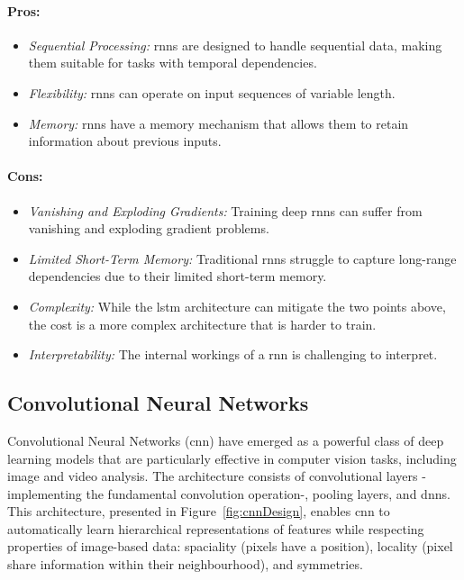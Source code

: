 \paragraph{Pros:}
\begin{itemize}
    \item \textit{Sequential Processing:} \glspl{rnn} are designed to handle sequential data, making them suitable for tasks with temporal dependencies.
    \item \textit{Flexibility:} \glspl{rnn} can operate on input sequences of variable length.
    \item \textit{Memory:} \glspl{rnn} have a memory mechanism that allows them to retain information about previous inputs.
\end{itemize}

\paragraph{Cons:}
\begin{itemize}
    \item \textit{Vanishing and Exploding Gradients:} Training deep \glspl{rnn} can suffer from vanishing and exploding gradient problems.
    \item \textit{Limited Short-Term Memory:} Traditional \glspl{rnn} struggle to capture long-range dependencies due to their limited short-term memory. 
    \item \textit{Complexity:} While the \gls{lstm} architecture can mitigate the two points above, the cost is a more complex architecture that is harder to train. 
    \item \textit{Interpretability:} The internal workings of a \gls{rnn} is challenging to interpret.
\end{itemize}

\subsection{Convolutional Neural Networks}
Convolutional Neural Networks (\gls{cnn}) \cite{NIPS198953c3bce6, NIPS2012_c399862d} have emerged as a powerful class of deep learning models that are particularly effective in computer vision tasks, including image and video analysis. The architecture consists of convolutional layers - implementing the fundamental convolution operation-, pooling layers, and \glspl{dnn}. This architecture, presented in Figure~\ref{fig:cnnDesign}, enables \gls{cnn} to automatically learn hierarchical representations of features while respecting properties of image-based data: spaciality (pixels have a position), locality (pixel share information within their neighbourhood), and symmetries.

